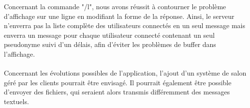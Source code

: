         Concernant la commande "/l", nous avons réussit à contourner le problème d'affichage sur une ligne en modifiant la forme de la réponse. Ainsi, le serveur n'enverra pas la liste complète des utilisateurs connectés en un seul message mais enverra un message pour chaque utilisateur connecté contenant un seul pseudonyme suivi d'un délais, afin d'éviter les problèmes de buffer dans l'affichage.
        
        \paragraph{}
        Concernant les évolutions possibles de l'application, l'ajout d'un système de salon géré par les clients pourrait être envisagé. Il pourrait également être possible d'envoyer des fichiers, qui seraient alors transmis différemment des messages textuels.
        